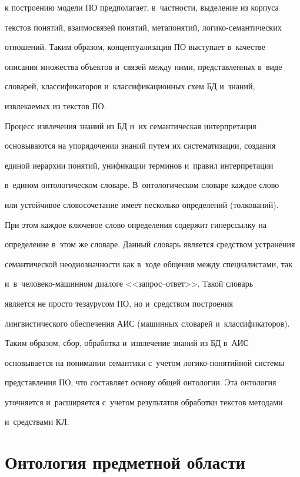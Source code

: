 к построению модели ПО предполагает, в~частности, выделение из корпуса 


текстов понятий, взаимосвязей понятий, метапонятий, логико-семантических 


отношений. Таким образом, концептуализация ПО выступает в~качестве 


описания множества объектов и~связей между ними, представленных в~виде 


словарей, классификаторов и~классификационных схем БД и~знаний, 


извлекаемых из текстов ПО.


  


  Процесс извлечения знаний из БД и~их семантическая интерпретация 


основываются на упорядочении знаний путем их систематизации, создания 


единой иерархии понятий, унификации терминов и~правил интерпретации 


в~едином онтологическом словаре. В~онтологическом словаре каждое слово 


или устойчивое словосочетание имеет несколько определений (толкований). 


При этом каждое ключевое слово определения содержит гиперссылку на 


определение в~этом же словаре. Данный словарь является средством устранения 


семантической неоднозначности как в~ходе общения между специалистами, так 


и~в~че\-ло\-ве\-ко-ма\-шин\-ном диалоге <<за\-прос--от\-вет>>. Такой словарь 


является не просто тезаурусом ПО, но и~средством построения 


лингвистического обеспечения АИС (машинных словарей и~классификаторов). 


Таким образом, сбор, обработка и~извлечение знаний из БД в~АИС 


основывается на понимании семантики с~учетом логико-понятийной системы 


представления ПО, что составляет основу общей онтологии. Эта онтология 


уточняется и~расширяется с~учетом результатов обработки текстов методами 


и~средствами КЛ.


  


\section{Онтология предметной области}


